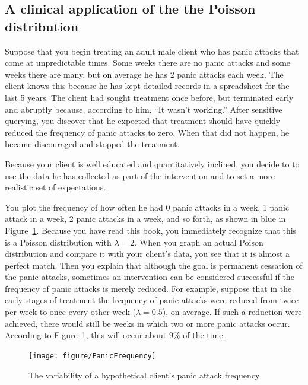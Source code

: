 \documentclass[nohyper,justified,marginals=raggedright]{tufte-book}\usepackage[]{graphicx}\usepackage[]{color}
\newenvironment{knitrout}{}{} %
\begin{document}
\subsection{A clinical application of the the Poisson distribution}

Suppose that you begin treating an adult male client who has panic attacks that come at unpredictable times.  Some weeks there are no panic attacks and some weeks there are many, but on average he has 2 panic attacks each week. The client knows this because he has kept detailed records in a spreadsheet for the last 5 years. The client had sought treatment once before, but terminated early and abruptly because, according to him, ``It wasn't working.'' After sensitive querying, you discover that he expected that treatment should have quickly reduced the frequency of panic attacks to zero. When that did not happen, he became discouraged and stopped the treatment.

Because your client is well educated and quantitatively inclined, you decide to to use the data he has collected as part of the intervention and to set a more realistic set of expectations.

You plot the frequency of how often he had 0 panic attacks in a week, 1 panic attack in a week, 2 panic attacks in a week, and so forth, as shown in blue in Figure~\ref{fig:PanicFrequency}. Because you have read this book, you immediately recognize that this is a Poisson distribution with $\lambda=2$. When you graph an actual Poison distribution and compare it with your client's data, you see that it is almost a perfect match. Then you explain that although the goal is permanent cessation of the panic attacks, sometimes an intervention can be considered successful if the frequency of panic attacks is merely reduced. For example, suppose that in the early stages of treatment the frequency of panic attacks were reduced from twice per week to once every other week ($\lambda=0.5$), on average. If such a reduction were achieved, there would still be weeks in which two or more panic attacks occur. According to Figure~\ref{fig:PanicFrequency}, this will occur about $9$\% of the time.

\begin{figure}
\begin{knitrout}
\color{fgcolor}
\texttt{[image: figure/PanicFrequency]} 

\end{knitrout}
\caption{The variability of a hypothetical client's panic attack frequency}
\label{fig:PanicFrequency}
\end{figure}
\end{document}
